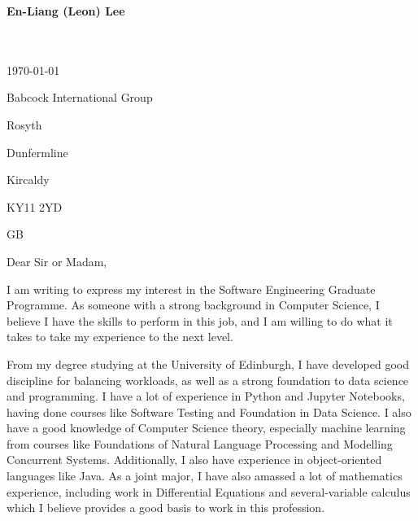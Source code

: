 \documentclass[11pt,english]{article}
\begin{document}
\setlength{\columnsep}{2.2em}
\setlength{\columnseprule}{4pt}



\newpage

\setlength{\columnsep}{2.2em}
\setlength{\columnseprule}{4pt}

\begin{minipage}[c][2.5cm][c]{1\mpwidth}
	\LARGE{\textbf{\textcolor{maincol}{En-Liang (Leon) Lee}}} \\[2pt]
	\normalsize{}\\
	\\
\end{minipage}

\bigskip\bigskip

\begin{minipage}[c][3cm][b]{1\mpwidth}
	\today
	\bigskip

	Babcock International Group

	Rosyth

	Dunfermline

	Kircaldy

	KY11 2YD

	GB
\end{minipage}
\bigskip\bigskip

Dear Sir or Madam,
\medskip

I am writing to express my interest in the Software Engineering Graduate Programme. As someone with a strong background in Computer Science, I believe I have the skills to perform in this job, and I am willing to do what it takes to take my experience to the next level.

\medskip

From my degree studying at the University of Edinburgh, I have developed good discipline for balancing workloads, as well as a strong foundation to data science and programming. I have a lot of experience in Python and Jupyter Notebooks, having done courses like Software Testing and Foundation in Data Science. I also have a good knowledge of Computer Science theory, especially machine learning from courses like Foundations of Natural Language Processing and Modelling Concurrent Systems. Additionally, I also have experience in object-oriented languages like Java. As a joint major, I have also amassed a lot of mathematics experience, including work in Differential Equations and several-variable calculus which I believe provides a good basis to work in this profession.
\end{document}
